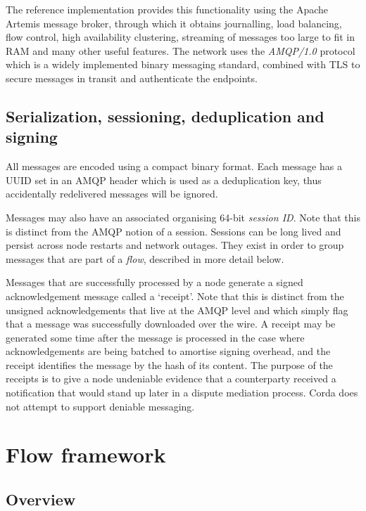 \documentclass{article}
\begin{document}
The reference implementation provides this functionality using the Apache Artemis message broker, through which it
obtains journalling, load balancing, flow control, high availability clustering, streaming of messages too large to fit
in RAM and many other useful features. The network uses the \emph{AMQP/1.0}\cite{AMQP} protocol which is a widely
implemented binary messaging standard, combined with TLS to secure messages in transit and authenticate the endpoints.

\subsection{Serialization, sessioning, deduplication and signing}

All messages are encoded using a compact binary format. Each message has a UUID set in an AMQP header which is used
as a deduplication key, thus accidentally redelivered messages will be ignored.


Messages may also have an associated organising 64-bit \emph{session ID}. Note that this is distinct from the AMQP
notion of a session. Sessions can be long lived and persist across node restarts and network outages. They exist in order
to group messages that are part of a \emph{flow}, described in more detail below.

Messages that are successfully processed by a node generate a signed acknowledgement message called a `receipt'. Note that
this is distinct from the unsigned acknowledgements that live at the AMQP level and which simply flag that a message was
successfully downloaded over the wire. A receipt may be generated some time after the message is processed in the case
where acknowledgements are being batched to amortise signing overhead, and the receipt identifies the message by the hash
of its content. The purpose of the receipts is to give a node undeniable evidence that a counterparty received a
notification that would stand up later in a dispute mediation process. Corda does not attempt to support deniable
messaging.

\section{Flow framework}\label{sec:flows}

\subsection{Overview}
\end{document}
